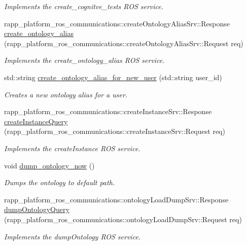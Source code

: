 \begin{DoxyCompactItemize}
\begin{DoxyCompactList}\small\item\em Implements the create\-\_\-cognitve\-\_\-tests R\-O\-S service. \end{DoxyCompactList}\item 
rapp\-\_\-platform\-\_\-ros\-\_\-communications\-::create\-Ontology\-Alias\-Srv\-::\-Response \hyperlink{classKnowrobWrapper_a6b5c92e16d3592a63d6509dbca1317fe}{create\-\_\-ontology\-\_\-alias} (rapp\-\_\-platform\-\_\-ros\-\_\-communications\-::create\-Ontology\-Alias\-Srv\-::\-Request req)
\begin{DoxyCompactList}\small\item\em Implements the create\-\_\-ontology\-\_\-alias R\-O\-S service. \end{DoxyCompactList}\item 
std\-::string \hyperlink{classKnowrobWrapper_a85be3123e645ca77004c7461e097a15e}{create\-\_\-ontology\-\_\-alias\-\_\-for\-\_\-new\-\_\-user} (std\-::string user\-\_\-id)
\begin{DoxyCompactList}\small\item\em Creates a new ontology alias for a user. \end{DoxyCompactList}\item 
rapp\-\_\-platform\-\_\-ros\-\_\-communications\-::create\-Instance\-Srv\-::\-Response \hyperlink{classKnowrobWrapper_a798a52556983073055944fd1c51495de}{create\-Instance\-Query} (rapp\-\_\-platform\-\_\-ros\-\_\-communications\-::create\-Instance\-Srv\-::\-Request req)
\begin{DoxyCompactList}\small\item\em Implements the create\-Instance R\-O\-S service. \end{DoxyCompactList}\item 
void \hyperlink{classKnowrobWrapper_a38b7c73ddd7fee3004e22f1110a86b6c}{dump\-\_\-ontology\-\_\-now} ()
\begin{DoxyCompactList}\small\item\em Dumps the ontology to default path. \end{DoxyCompactList}\item 
rapp\-\_\-platform\-\_\-ros\-\_\-communications\-::ontology\-Load\-Dump\-Srv\-::\-Response \hyperlink{classKnowrobWrapper_a86796d95e57f4620474dab7e1f2df128}{dump\-Ontology\-Query} (rapp\-\_\-platform\-\_\-ros\-\_\-communications\-::ontology\-Load\-Dump\-Srv\-::\-Request req)
\begin{DoxyCompactList}\small\item\em Implements the dump\-Ontology R\-O\-S service. \end{DoxyCompactList}\item 

\end{DoxyCompactItemize}
